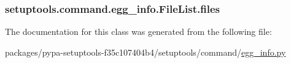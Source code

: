\subsubsection[{files}]{\setlength{\rightskip}{0pt plus 5cm}setuptools.\+command.\+egg\+\_\+info.\+File\+List.\+files}\label{classsetuptools_1_1command_1_1egg__info_1_1FileList_a5f5f8c4a6db4580cf53125d54a15d75a}


The documentation for this class was generated from the following file\+:\begin{DoxyCompactItemize}
\item 
packages/pypa-\/setuptools-\/f35c107404b4/setuptools/command/\hyperlink{egg__info_8py}{egg\+\_\+info.\+py}\end{DoxyCompactItemize}
